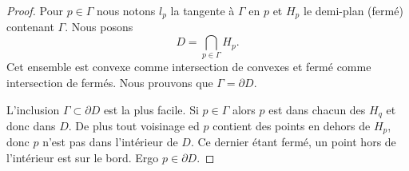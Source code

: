 \begin{proof}
    Pour \( p\in \Gamma\) nous notons \( l_p\) la tangente à \( \Gamma\) en \( p\) et \( H_p\) le demi-plan (fermé) contenant \( \Gamma\). Nous posons
    \begin{equation}
        D=\bigcap_{p\in \Gamma}H_p.
    \end{equation}
    Cet ensemble est convexe comme intersection de convexes et fermé comme intersection de fermés. Nous prouvons que \( \Gamma=\partial D\). 

    L'inclusion \( \Gamma\subset\partial D\) est la plus facile. Si \( p\in \Gamma\) alors \( p\) est dans chacun des \( H_q\) et donc dans \( D\). De plus tout voisinage ed \( p\) contient des points en dehors de \( H_p\), donc \( p\) n'est pas dans l'intérieur de \( D\). Ce dernier étant fermé, un point hors de l'intérieur est sur le bord. Ergo \( p\in\partial D\).


\end{proof}
